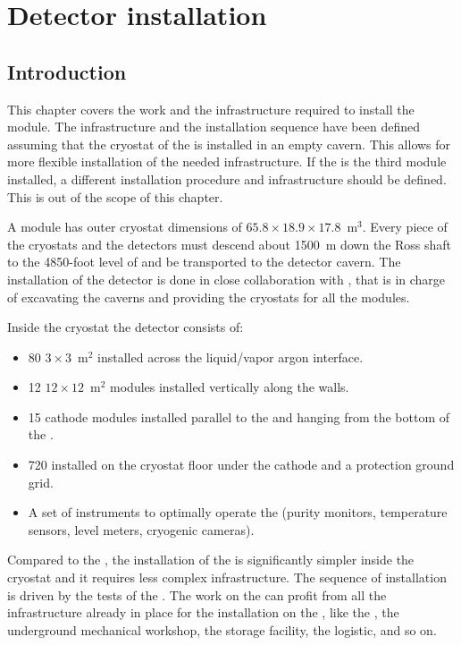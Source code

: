 \chapter{Detector installation}
\label{ch:dp-installation}

\section{Introduction}
\label{ch:dp-install-intro}

This chapter covers the work and the infrastructure required to install the    module.
The infrastructure and the installation sequence have been defined assuming that the cryostat of the  is installed in an empty cavern.
This allows for more flexible installation of the needed infrastructure.
If the  is the third module installed, a different installation procedure and infrastructure should be defined.
This is out of the scope of this chapter.

A   module has outer cryostat dimensions of $65.8 \times 18.9 \times 17.8$~m$^3$.
Every piece of the cryostats and the detectors must descend about 1500~m down the Ross shaft to the 4850-foot level of  and be transported to the detector cavern.
The installation of the detector is done in close collaboration with , that is in charge of  excavating the caverns and providing the cryostats for all the  modules.

Inside the cryostat the  detector consists of:
\begin{itemize}
\item 80 $3 \times 3$~m$^2$  installed across the liquid/vapor argon interface.
\item  12 $12 \times 12$~m$^2$  modules installed vertically along the walls.
\item  15 cathode modules  installed parallel to the  and hanging from the bottom of the .
\item  720  installed on the cryostat floor under the cathode and a protection ground grid.
\item  A set of instruments to optimally operate the  (purity monitors, temperature sensors, level meters, cryogenic cameras).
\end{itemize}

Compared to the , the installation of the  is significantly simpler inside the cryostat and it requires less complex infrastructure.
The sequence of installation is driven by the tests of the .
The work on the  can profit from all the infrastructure already in place for the installation on the , like the , the underground mechanical workshop, the storage facility, the logistic, and so on.

